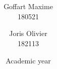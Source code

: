 \documentclass[a4paper, 11pt, oneside]{article}
\title{\ClassName\\\vspace*{0.8cm}\ProjectName\vspace{0.8cm}}
\author{Goffart Maxime \\180521 \and Joris Olivier \\ 182113}
\date{\vspace{1cm}Academic year \AcademicYear}
\begin{document}
\begin{titlingpage}
{\let\newpage\relax\maketitle}
\end{titlingpage}

\end{document}
